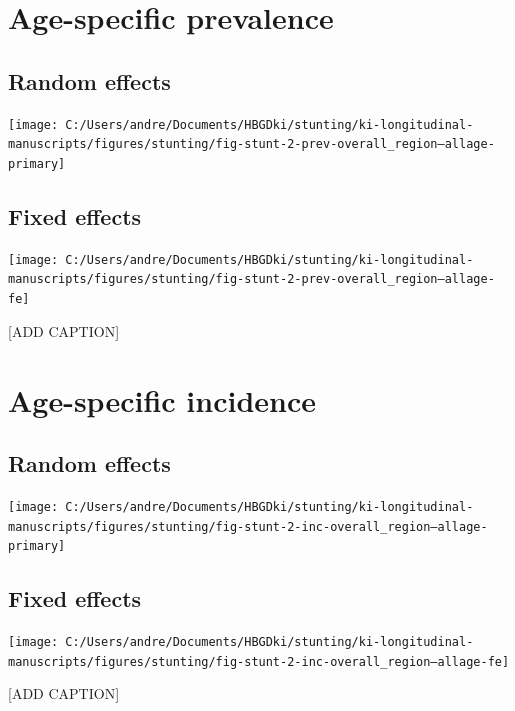\documentclass[
  9pt,
]{book}
\begin{document}
\hypertarget{age-specific-prevalence-2}{%
\section{Age-specific prevalence}\label{age-specific-prevalence-2}}

\hypertarget{random-effects}{%
\subsection{Random effects}\label{random-effects}}

\texttt{[image: C:/Users/andre/Documents/HBGDki/stunting/ki-longitudinal-manuscripts/figures/stunting/fig-stunt-2-prev-overall\_region--allage-primary]}

\hypertarget{fixed-effects-1}{%
\subsection{Fixed effects}\label{fixed-effects-1}}

\texttt{[image: C:/Users/andre/Documents/HBGDki/stunting/ki-longitudinal-manuscripts/figures/stunting/fig-stunt-2-prev-overall\_region--allage-fe]}

{[}ADD CAPTION{]}

\hypertarget{age-specific-incidence-2}{%
\section{Age-specific incidence}\label{age-specific-incidence-2}}

\hypertarget{random-effects-1}{%
\subsection{Random effects}\label{random-effects-1}}

\texttt{[image: C:/Users/andre/Documents/HBGDki/stunting/ki-longitudinal-manuscripts/figures/stunting/fig-stunt-2-inc-overall\_region--allage-primary]}

\hypertarget{fixed-effects-2}{%
\subsection{Fixed effects}\label{fixed-effects-2}}

\texttt{[image: C:/Users/andre/Documents/HBGDki/stunting/ki-longitudinal-manuscripts/figures/stunting/fig-stunt-2-inc-overall\_region--allage-fe]}

{[}ADD CAPTION{]}
\end{document}
